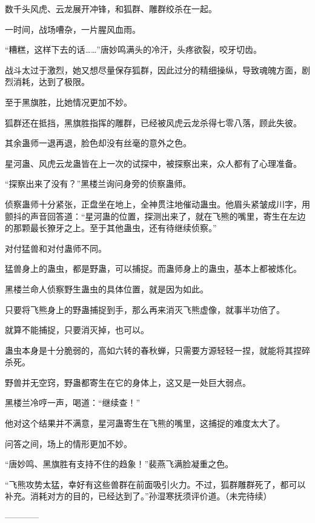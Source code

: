\begin{this_body}
数千头风虎、云龙展开冲锋，和狐群、雕群绞杀在一起。

一时间，战场嘈杂，一片腥风血雨。

“糟糕，这样下去的话……”唐妙鸣满头的冷汗，头疼欲裂，咬牙切齿。

战斗太过于激烈，她又想尽量保存狐群，因此过分的精细操纵，导致魂魄方面，剧烈消耗，达到了极限。

至于黑旗胜，比她情况更加不妙。

狐群还在抵挡，黑旗胜指挥的雕群，已经被风虎云龙杀得七零八落，顾此失彼。

其余蛊师一退再退，脸色却没有丝毫的意外之色。

星河蛊、风虎云龙蛊皆在上一次的试探中，被探察出来，众人都有了心理准备。

“探察出来了没有？”黑楼兰询问身旁的侦察蛊师。

侦察蛊师十分紧张，正盘坐在地上，全神贯注地催动蛊虫。他眉头紧皱成川字，用颤抖的声音回答道：“星河蛊的位置，探测出来了，就在飞熊的嘴里，寄生在左边的那颗最长獠牙之上。至于其他蛊虫，还有待继续侦察。”

对付猛兽和对付蛊师不同。

猛兽身上的蛊虫，都是野蛊，可以捕捉。而蛊师身上的蛊虫，基本上都被炼化。

黑楼兰命人侦察野生蛊虫的具体位置，就是因为如此。

只要将飞熊身上的野蛊捕捉到手，那么再来消灭飞熊虚像，就事半功倍了。

就算不能捕捉，只要消灭掉，也可以。

蛊虫本身是十分脆弱的，高如六转的春秋蝉，只需要方源轻轻一捏，就能将其捏碎杀死。

野兽并无空窍，野蛊都寄生在它的身体上，这又是一处巨大弱点。

黑楼兰冷哼一声，喝道：“继续查！”

他对这个结果并不满意，星河蛊寄生在飞熊的嘴里，这捕捉的难度太大了。

问答之间，场上的情形更加不妙。

“唐妙鸣、黑旗胜有支持不住的趋象！”裴燕飞满脸凝重之色。

“飞熊攻势太猛，幸好有这些兽群在前面吸引火力。不过，狐群雕群死了，都可以补充。消耗对方的目的，已经达到了。”孙湿寒抚须评价道。（未完待续）

------------

\end{this_body}


